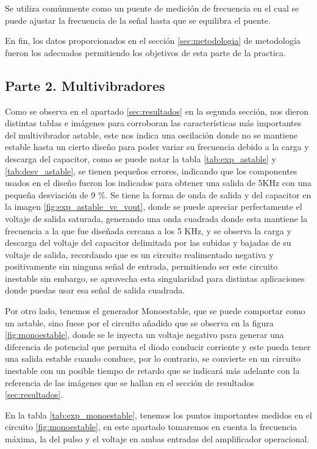         Se utiliza comúnmente como un puente de medición de frecuencia en el cual se puede ajustar la frecuencia de la señal hasta que se equilibra el puente. 

        En fin, los datos proporcionados en el sección \ref{sec:metodologia} de metodología fueron los adecuados permitiendo los objetivos de esta parte de la practica.

    \subsection{Parte 2. Multivibradores}    
        Como se observa en el apartado \ref{sec:resultados} en la segunda sección, nos dieron distintas tablas e imágenes para corroboran las características más importantes del multivibrador astable, este nos indica una oscilación donde no se mantiene estable hasta un cierto diseño para poder variar su frecuencia debido a la carga y descarga del capacitor, como se puede notar la tabla \ref{tab:exp_astable} y \ref{tab:desv_astable}, se tienen pequeños errores, indicando que los componentes usados en el diseño fueron los indicados para obtener una salida de 5KHz con una pequeña desviación de 9 \%. Se tiene la forma de onda de salida y del capacitor en la imagen \ref{fig:exp_astable_vc_vout}, donde se puede apreciar perfectamente el voltaje de salida saturada, generando una onda cuadrada donde esta mantiene la frecuencia a la que fue diseñada cercana a los 5 KHz, y se observa la carga y descarga del voltaje del capacitor delimitada por las subidas y bajadas de su voltaje de salida, recordando que es un circuito realimentado negativa y positivamente sin ninguna señal de entrada, permitiendo ser este circuito inestable sin embargo, se aprovecha esta singularidad para distintas aplicaciones donde puedas usar esa señal de salida cuadrada.

        Por otro lado, tenemos el generador Monoestable, que se puede comportar como un astable, sino fuese por el circuito añadido que se observa en la figura \ref{fig:monoestable}, donde se le inyecta un voltaje negativo para generar una diferencia de potencial que permita el diodo conducir corriente y este pueda tener una salida estable cuando conduce, por lo contrario, se convierte en un circuito inestable con un posible tiempo de retardo que se indicará más adelante con la referencia de las imágenes que se hallan en el sección de resultados \ref{sec:resultados}.

        En la tabla \ref{tab:exp_monoestable}, tenemos los puntos importantes medidos en el circuito \ref{fig:monoestable}, en este apartado tomaremos en cuenta la frecuencia máxima, la del pulso y el voltaje en ambas entradas del amplificador operacional. 

